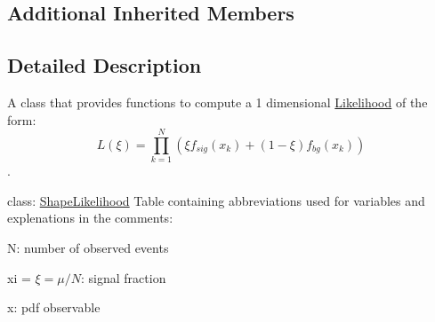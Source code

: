 \subsection*{Additional Inherited Members}


\subsection{Detailed Description}
A class that provides functions to compute a 1 dimensional \hyperlink{classLikelihood}{Likelihood} of the form\-: \[ L(\xi) = \prod^N_{k=1} (\xi f_{sig}(x_k) + (1-\xi) f_{bg}(x_k)) \]. 

class\-: \hyperlink{classShapeLikelihood}{Shape\-Likelihood} Table containing abbreviations used for variables and explenations in the comments\-: \par
 N\-: number of observed events \par
 xi = $ \xi = \mu / N $\-: signal fraction \par
 x\-: pdf observable \par


